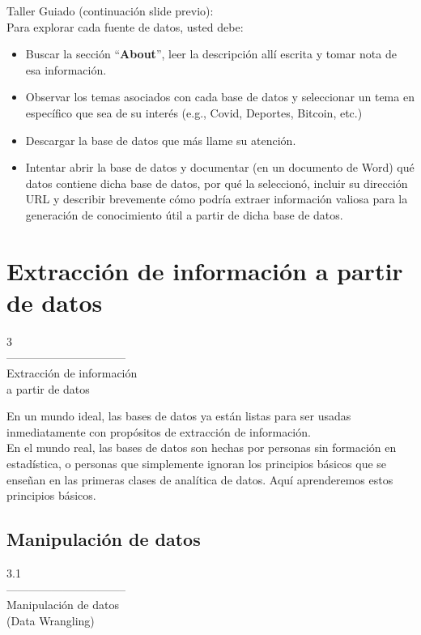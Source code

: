 \documentclass[aspectratio=169]{beamer}
\begin{document}
\begin{frame}
Taller Guiado (continuación slide previo):\\
Para explorar cada fuente de datos, usted debe:\\
\begin{itemize}
\item Buscar la sección ``\textbf{About}'', leer la descripción allí escrita y tomar nota de esa información.
\item Observar los temas asociados con cada base de datos y seleccionar un tema en específico que sea de su interés (e.g., Covid, Deportes, Bitcoin, etc.)
\item Descargar la base de datos que más llame su atención. 
\item Intentar abrir la base de datos y documentar (en un documento de Word) qué datos contiene dicha base de datos, por qué la seleccionó, incluir su dirección URL y describir brevemente cómo podría extraer información valiosa para la generación de conocimiento útil a partir de dicha base de datos. 
\end{itemize}
\end{frame}

\section{Extracción de información a partir de datos}

\begin{frame}
\begin{center}
\Huge
\textcolor{azulcesaclaro}{3\\
--------------------------------\\
Extracción de información\\
a partir de datos}
\end{center}
\end{frame}

\begin{frame}
En un mundo ideal, las bases de datos ya están listas para ser usadas inmediatamente con propósitos de extracción de información. \\
\vspace{0.3cm}
En el mundo real, las bases de datos son hechas por personas sin formación en estadística, o personas que simplemente ignoran los principios básicos que se enseñan en las primeras clases de analítica de datos. Aquí aprenderemos estos principios básicos.
\end{frame}

\subsection{Manipulación de datos}
\begin{frame}
\begin{center}
\Huge
\textcolor{azulcesaclaro}{3.1\\
--------------------------------\\
Manipulación de datos\\
(Data Wrangling)}
\end{center}
\end{frame}
\end{document}
